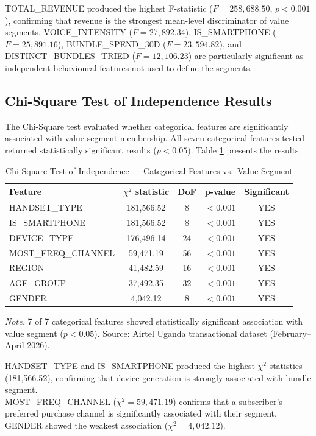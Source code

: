 TOTAL\_REVENUE produced the highest F-statistic ($F = 258,688.50$, $p < 0.001$), confirming that revenue is the strongest mean-level discriminator of value segments. VOICE\_INTENSITY ($F = 27,892.34$), IS\_SMARTPHONE ($F = 25,891.16$), BUNDLE\_SPEND\_30D ($F = 23,594.82$), and DISTINCT\_BUNDLES\_TRIED ($F = 12,106.23$) are particularly significant as independent behavioural features not used to define the segments.

\subsection{Chi-Square Test of Independence Results}

The Chi-Square test evaluated whether categorical features are significantly associated with value segment membership. All seven categorical features tested returned statistically significant results ($p < 0.05$). Table \ref{tab:chisquare} presents the results.

\begin{table}[H]
\centering
\caption{Chi-Square Test of Independence --- Categorical Features vs.\ Value Segment}
\label{tab:chisquare}
\begin{tabular}{lcccc}
\toprule
\textbf{Feature} & \textbf{$\chi^2$ statistic} & \textbf{DoF} & \textbf{p-value} & \textbf{Significant} \\
\midrule
HANDSET\_TYPE        & 181,566.52 &  8 & $<0.001$ & YES \\
IS\_SMARTPHONE       & 181,566.52 &  8 & $<0.001$ & YES \\
DEVICE\_TYPE         & 176,496.14 & 24 & $<0.001$ & YES \\
MOST\_FREQ\_CHANNEL  &  59,471.19 & 56 & $<0.001$ & YES \\
REGION               &  41,482.59 & 16 & $<0.001$ & YES \\
AGE\_GROUP           &  37,492.35 & 32 & $<0.001$ & YES \\
GENDER               &   4,042.12 &  8 & $<0.001$ & YES \\
\bottomrule
\end{tabular}
\begin{flushleft}
\small\textit{Note.} 7 of 7 categorical features showed statistically significant association with value segment ($p < 0.05$). Source: Airtel Uganda transactional dataset (February--April 2026).
\end{flushleft}
\end{table}

HANDSET\_TYPE and IS\_SMARTPHONE produced the highest $\chi^2$ statistics (181,566.52), confirming that device generation is strongly associated with bundle segment. 
\\MOST\_FREQ\_CHANNEL ($\chi^2 = 59{,}471.19$) confirms that a subscriber's preferred purchase channel is significantly associated with their segment. GENDER showed the weakest association ($\chi^2 = 4{,}042.12$).

